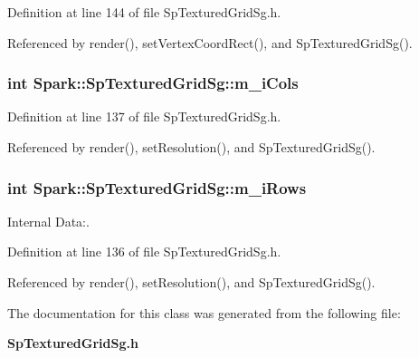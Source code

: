 Definition at line 144 of file Sp\-Textured\-Grid\-Sg.h.

Referenced by render(), set\-Vertex\-Coord\-Rect(), and Sp\-Textured\-Grid\-Sg().
\subsubsection{\setlength{\rightskip}{0pt plus 5cm}int {\bf Spark::Sp\-Textured\-Grid\-Sg::m\_\-i\-Cols}\hspace{0.3cm}{\tt  [protected]}}\label{classSpark_1_1SpTexturedGridSg_p1}


Definition at line 137 of file Sp\-Textured\-Grid\-Sg.h.

Referenced by render(), set\-Resolution(), and Sp\-Textured\-Grid\-Sg().
\subsubsection{\setlength{\rightskip}{0pt plus 5cm}int {\bf Spark::Sp\-Textured\-Grid\-Sg::m\_\-i\-Rows}\hspace{0.3cm}{\tt  [protected]}}\label{classSpark_1_1SpTexturedGridSg_p0}


Internal Data:. 

Definition at line 136 of file Sp\-Textured\-Grid\-Sg.h.

Referenced by render(), set\-Resolution(), and Sp\-Textured\-Grid\-Sg().

The documentation for this class was generated from the following file:\begin{CompactItemize}
\item 
{\bf Sp\-Textured\-Grid\-Sg.h}\end{CompactItemize}
